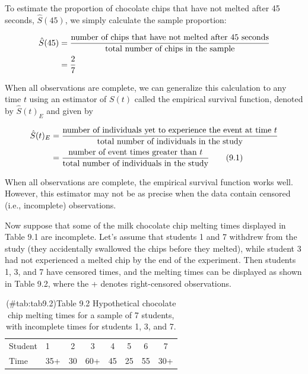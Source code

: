 \documentclass[
]{report}
\begin{document}
To estimate the proportion of chocolate chips that have not melted after 45 seconds, \(\hat S(45)\), we simply
calculate the sample proportion:

\begin{align}
\hat S(45) &= \frac{\text{number of chips that have not melted after 45 seconds}}{\text{total number of chips in the sample}} \notag \\
&= \frac{2}{7} \notag
\end{align}

When all observations are complete, we can generalize this calculation to any time \(t\) using an estimator of \(S(t)\) called the empirical survival function, denoted by \(\hat S(t)_{E}\) and given by

\begin{align}\label{9.1}
\hat S(t)_{E}
&= \frac{\text{number of individuals yet to experience the event at time }t}{\text{total number of individuals in the study}} \notag \\
&= \frac{\text{number of event times greater than }t}{\text{total number of individuals in the study}}
\tag{9.1}
\end{align}

When all observations are complete, the empirical survival function works well. However, this estimator may not be as precise when the data contain censored (i.e., incomplete) observations.

Now suppose that some of the milk chocolate chip melting times displayed in Table 9.1 are incomplete. Let's assume that students 1 and 7 withdrew from the study (they accidentally swallowed the chips before they melted), while student 3 had not experienced a melted chip by the end of the experiment. Then students 1, 3, and 7 have censored times, and the melting times can be displayed as shown in Table 9.2, where the + denotes right-censored observations.

\begin{table}[!h]
\centering
\caption{(\#tab:tab9.2)Table 9.2 Hypothetical chocolate chip melting times for a sample of 7 students, with incomplete times for students 1, 3, and 7.}
\centering
\begin{tabular}[t]{llcccccc}
\toprule
  &  &  &  &  &  &  & \\
\midrule
Student & 1 & 2 & 3 & 4 & 5 & 6 & 7\\
Time & 35+ & 30 & 60+ & 45 & 25 & 55 & 30+\\
\bottomrule
\end{tabular}
\end{table}
\end{document}
